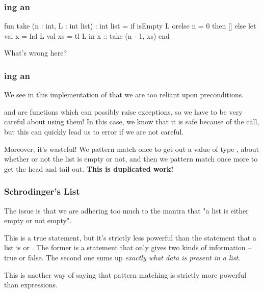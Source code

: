 \documentclass[aspectratio=169, handout]{beamer}
\begin{document}
\begin{frame}[fragile]
  \frametitle{ing an }

  \begin{codeblock}
    fun take (n : int, L : int list) : int list =
      if isEmpty L orelse n = 0 then
        []
      else
        let
          val x = hd L
          val xs = tl L
        in
          x :: take (n - 1, xs)
        end
  \end{codeblock}

  \pause
  \vspace{\fill}

  What's wrong here?
\end{frame}

\begin{frame}[fragile]
  \frametitle{ing an }

  We see in this implementation of  that we are too reliant
  upon preconditions.

  \pause
  \vspace{\fill}

   and  are functions which can possibly raise exceptions,
  so we have to be very careful about using them! In this case, we know that
  it is safe because of the  call, but this can quickly lead
  us to error if we are not careful.

  \pause
  \vspace{\fill}

  Moreover, it's wasteful! We pattern match once to get out a value of type
  , about whether or not the list is empty or not, and then we
  pattern match once more to get the head and tail out. \textbf{This is duplicated
  work!}
\end{frame}

\begin{frame}[fragile]
  \frametitle{Schrodinger's List}

  The issue is that we are adhering too much to the mantra that "a list is
  either empty or not empty".

  \pause
  \vspace{\fill}

  This is a true statement, but it's strictly less powerful than the statement
  that a list is \code{[]} or . The former is a statement that only
  gives two kinds of information -- true or false. The second one sums up
  \textit{exactly what data is present in a list}.

  \pause
  \vspace{\fill}

  This is another way of saying that pattern matching is strictly more powerful
  than  expressions.
\end{frame}
\end{document}

